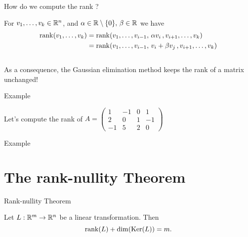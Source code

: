 \documentclass{beamer}
\begin{document}
\begin{frame}[t]{How do we compute the rank ?}
	\grid

	For $v_1, \dots, v_k \in \mathbb{R}^n$, and $\alpha \in \mathbb{R} \setminus \{0\}, \, \beta \in \mathbb{R}$ we have
	\begin{align*}
		{{\rm rank}}(v_1, \dots, v_k)
		&=
		{{\rm rank}}(v_1, \dots, v_{i-1}, \, \alpha v_i \, , v_{i+1}, \dots, v_k)\\
		&=
		{{\rm rank}}(v_1, \dots, v_{i-1}, \, v_i + \beta v_j \, , v_{i+1}, \dots, v_k)
	\end{align*}
	\vspace{2cm}
	\\
	As a consequence, the Gaussian elimination method keeps the rank of a matrix unchanged!
\end{frame}

\begin{frame}[t]{Example}
	\grid

	Let's compute the rank of \quad
	$\displaystyle
	A = 
	\begin{pmatrix}
		1  & -1 & 0 & 1 \\
		2  & 0 & 1 & -1 \\
		-1  & 5 & 2 & 0 
	\end{pmatrix}
	$
\end{frame}

\begin{frame}[t]{Example}
	\grid

\end{frame}

\section{The rank-nullity Theorem}
\begin{frame}[t]{Rank-nullity Theorem}
	\grid

	\vspace{-0.3cm}
	\begin{theorem}
		Let $L: \mathbb{R}^m \to \mathbb{R}^n$ be a linear transformation. Then
		$$
		{{\rm rank}}(L) + {{\rm dim}}({{\rm Ker}}(L)) = m.
		$$
	\end{theorem}

\end{frame}
\end{document}
